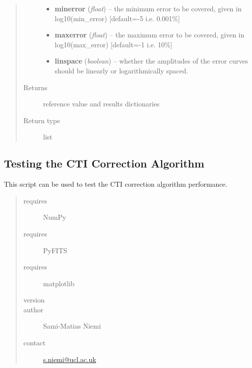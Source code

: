\documentclass[a4paper,11pt,english]{sphinxmanual}
\begin{document}
\begin{fulllineitems}
\begin{quote}
\begin{description}
\begin{itemize}
\item {} 
\textbf{minerror} (\emph{float}) -- the minimum error to be covered, given in log10(min\_error) {[}default=-5 i.e. 0.001\%{]}

\item {} 
\textbf{maxerror} (\emph{float}) -- the maximum error to be covered, given in log10(max\_error) {[}default=-1 i.e. 10\%{]}

\item {} 
\textbf{linspace} (\emph{boolean}) -- whether the amplitudes of the error curves should be linearly or logarithmically spaced.

\end{itemize}

\item[{Returns}] \leavevmode
reference value and results dictionaries

\item[{Return type}] \leavevmode
list

\end{description}\end{quote}

\end{fulllineitems}

\label{reduction:module-analysis.testCTIcorrection}

\subsection{Testing the CTI Correction Algorithm}
\label{reduction:testing-the-cti-correction-algorithm}
This script can be used to test the CTI correction algorithm performance.
\begin{quote}\begin{description}
\item[{requires}] \leavevmode
NumPy

\item[{requires}] \leavevmode
PyFITS

\item[{requires}] \leavevmode
matplotlib

\item[{version}] 

\item[{author}] \leavevmode
Sami-Matias Niemi

\item[{contact}] \leavevmode
\href{mailto:s.niemi@ucl.ac.uk}{s.niemi@ucl.ac.uk}

\end{description}\end{quote}
\end{document}
